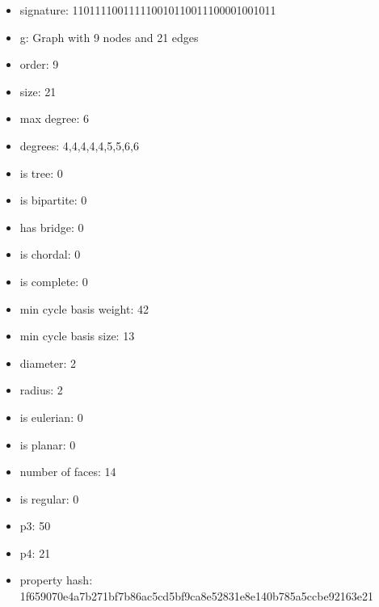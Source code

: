 \newpage
\begin{figure}
\end{figure}
\begin{itemize}
\item signature: 110111100111110010110011100001001011
\item g: Graph with 9 nodes and 21 edges
\item order: 9
\item size: 21
\item max degree: 6
\item degrees: 4,4,4,4,4,5,5,6,6
\item is tree: 0
\item is bipartite: 0
\item has bridge: 0
\item is chordal: 0
\item is complete: 0
\item min cycle basis weight: 42
\item min cycle basis size: 13
\item diameter: 2
\item radius: 2
\item is eulerian: 0
\item is planar: 0
\item number of faces: 14
\item is regular: 0
\item p3: 50
\item p4: 21
\item property hash: 1f659070e4a7b271bf7b86ac5cd5bf9ca8e52831e8e140b785a5ccbe92163e21
\end{itemize}
